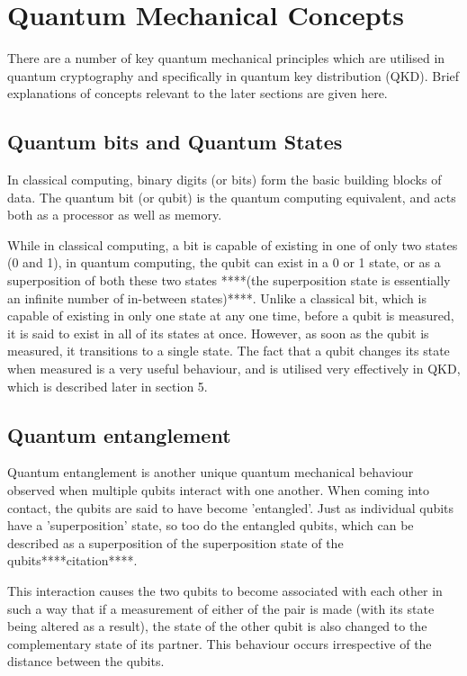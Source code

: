 \documentclass[runningheads,a4paper]{llncs}
\begin{document}
\section{Quantum Mechanical Concepts}

There are a number of key quantum mechanical principles which are utilised in quantum cryptography and specifically in quantum key distribution (QKD). Brief explanations of concepts relevant to the later sections are given here.

\subsection{Quantum bits and Quantum States}

In classical computing, binary digits (or bits) form the basic building blocks of data. The quantum bit (or qubit) is the quantum computing equivalent, and acts both as a processor as well as memory. 

While in classical computing, a bit is capable of existing in one of only two states (0 and 1), in quantum computing, the qubit can exist in a 0 or 1 state, or as a superposition of both these two states ****(the superposition state is essentially an infinite number of in-between states)****. Unlike a classical bit, which is capable of existing in only one state at any one time, before a qubit is measured, it is said to exist in all of its states at once. However, as soon as the qubit is measured, it transitions to a single state. The fact that a qubit changes its state when measured is a very useful behaviour, and is utilised very effectively in QKD, which is described later in section 5.

\subsection{Quantum entanglement}

Quantum entanglement is another unique quantum mechanical behaviour observed when multiple qubits interact with one another. When coming into contact, the qubits are said to have become 'entangled'. Just as individual qubits have a 'superposition' state, so too do the entangled qubits, which can be described as a superposition of the superposition state of the qubits****citation****.

This interaction causes the two qubits to become associated with each other in such a way that if a measurement of either of the pair is made (with its state being altered as a result), the state of the other qubit is also changed to the complementary state of its partner. This behaviour occurs irrespective of the distance between the qubits.
\end{document}
